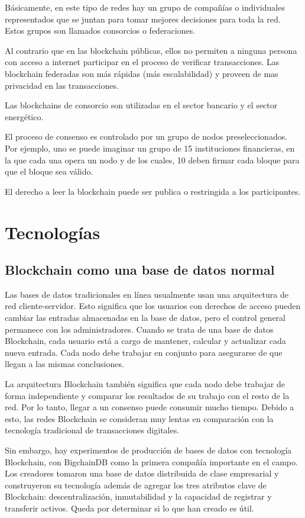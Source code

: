 \documentclass[conference]{IEEEtran}
\begin{document}
Básicamente, en este tipo de redes hay un grupo de compañías o individuales representados que se juntan para tomar mejores decisiones para toda la red. Estos grupos son llamados consorcios o federaciones.

Al contrario que en las blockchain públicas, ellos no permiten a ninguna persona con acceso a internet participar en el proceso de verificar transacciones. Las blockchain federadas son más rápidas (más escalabilidad) y proveen de mas privacidad en las transacciones.

Las blockchains de consorcio son utilizadas en el sector bancario y el sector energético.

El proceso de consenso es controlado por un grupo de nodos preseleccionados. Por ejemplo, uno se puede imaginar un grupo de 15 instituciones financieras, en la que cada una opera un nodo y de los cuales, 10 deben firmar cada bloque para que el bloque sea válido.

El derecho a leer la blockchain puede ser publica o restringida a los participantes.

\section{Tecnologías}

\subsection{Blockchain como una base de datos normal}

Las bases de datos tradicionales en línea usualmente usan una arquitectura de red cliente-servidor. Esto significa que los usuarios con derechos de acceso pueden cambiar las entradas almacenadas en la base de datos, pero el control general permanece con los administradores. Cuando se trata de una base de datos Blockchain, cada usuario está a cargo de mantener, calcular y actualizar cada nueva entrada. Cada nodo debe trabajar en conjunto para asegurarse de que llegan a las mismas conclusiones.

La arquitectura Blockchain también significa que cada nodo debe trabajar de forma independiente y comparar los resultados de su trabajo con el resto de la red. Por lo tanto, llegar a un consenso puede consumir mucho tiempo. Debido a esto, las redes Blockchain se consideran muy lentas en comparación con la tecnología tradicional de transacciones digitales.

Sin embargo, hay experimentos de producción de bases de datos con tecnología Blockchain, con BigchainDB como la primera compañía importante en el campo. Los creadores tomaron una base de datos distribuida de clase empresarial y construyeron su tecnología además de agregar los tres atributos clave de Blockchain: descentralización, inmutabilidad y la capacidad de registrar y transferir activos. Queda por determinar si lo que han creado es útil.
\end{document}
